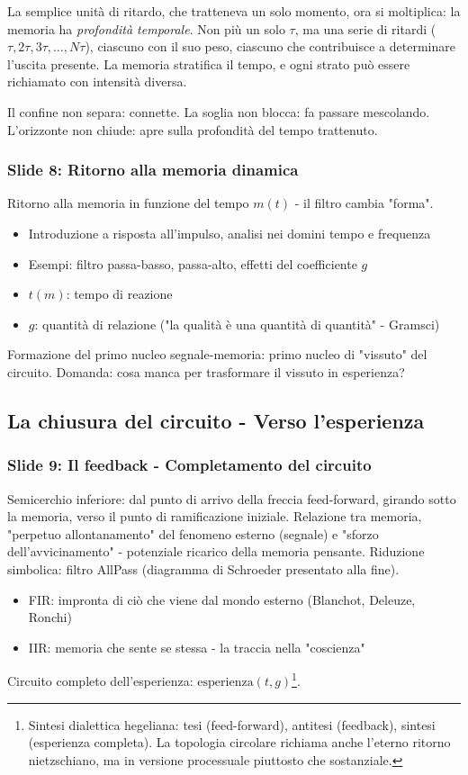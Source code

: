 La semplice unità di ritardo, che tratteneva un solo momento, ora si moltiplica: la memoria ha \emph{profondità temporale}. Non più un solo $\tau$, ma una serie di ritardi ($\tau, 2\tau, 3\tau, \ldots, N\tau$), ciascuno con il suo peso, ciascuno che contribuisce a determinare l'uscita presente. La memoria stratifica il tempo, e ogni strato può essere richiamato con intensità diversa.

Il confine non separa: connette. La soglia non blocca: fa passare mescolando. L'orizzonte non chiude: apre sulla profondità del tempo trattenuto.

\subsubsection{Slide 8: Ritorno alla memoria dinamica}
Ritorno alla memoria in funzione del tempo $m(t)$ - il filtro cambia "forma".
\begin{itemize}
\item Introduzione a risposta all'impulso, analisi nei domini tempo e frequenza
\item Esempi: filtro passa-basso, passa-alto, effetti del coefficiente $g$
\item $t(m)$: tempo di reazione
\item $g$: quantità di relazione ("la qualità è una quantità di quantità" - Gramsci)
\end{itemize}
Formazione del primo nucleo segnale-memoria: primo nucleo di "vissuto" del circuito.
Domanda: cosa manca per trasformare il vissuto in esperienza?

\subsection{La chiusura del circuito - Verso l'esperienza}

\subsubsection{Slide 9: Il feedback - Completamento del circuito}
Semicerchio inferiore: dal punto di arrivo della freccia feed-forward, girando sotto la memoria, verso il punto di ramificazione iniziale.
Relazione tra memoria, "perpetuo allontanamento" del fenomeno esterno (segnale) e "sforzo dell'avvicinamento" - potenziale ricarico della memoria pensante.
Riduzione simbolica: filtro AllPass (diagramma di Schroeder presentato alla fine).
\begin{itemize}
\item FIR: impronta di ciò che viene dal mondo esterno (Blanchot, Deleuze, Ronchi)
\item IIR: memoria che sente se stessa - la traccia nella "coscienza"
\end{itemize}
Circuito completo dell'esperienza: $\text{esperienza}(t,g)$\footnote{Sintesi dialettica hegeliana: tesi (feed-forward), antitesi (feedback), sintesi (esperienza completa). La topologia circolare richiama anche l'eterno ritorno nietzschiano, ma in versione processuale piuttosto che sostanziale.}.

